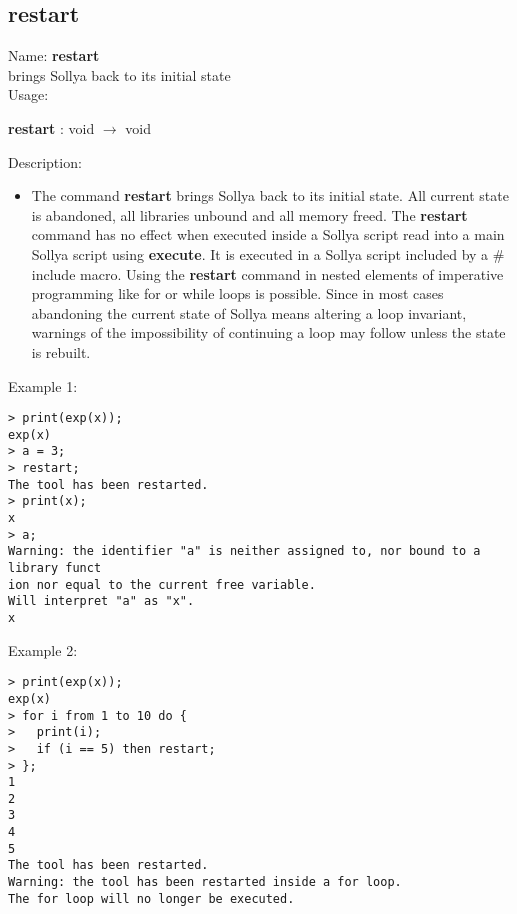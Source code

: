 \subsection{ restart }
\noindent Name: \textbf{restart}\\
brings Sollya back to its initial state\\

\noindent Usage: 
\begin{center}
\textbf{restart} : \textsf{void} $\rightarrow$ \textsf{void}\\
\end{center}
\noindent Description: \begin{itemize}

\item The command \textbf{restart} brings Sollya back to its initial state.  All
   current state is abandoned, all libraries unbound and all memory freed.
   The \textbf{restart} command has no effect when executed inside a Sollya
   script read into a main Sollya script using \textbf{execute}. It is executed
   in a Sollya script included by a $\#$include macro.
   Using the \textbf{restart} command in nested elements of imperative
   programming like for or while loops is possible. Since in most cases
   abandoning the current state of Sollya means altering a loop
   invariant, warnings of the impossibility of continuing a loop may
   follow unless the state is rebuilt.
\end{itemize}
\noindent Example 1: 
\begin{center}\begin{minipage}{15cm}\begin{Verbatim}[frame=single]
> print(exp(x));
exp(x)
> a = 3;
> restart;
The tool has been restarted.
> print(x);
x
> a;
Warning: the identifier "a" is neither assigned to, nor bound to a library funct
ion nor equal to the current free variable.
Will interpret "a" as "x".
x
\end{Verbatim}
\end{minipage}\end{center}
\noindent Example 2: 
\begin{center}\begin{minipage}{15cm}\begin{Verbatim}[frame=single]
> print(exp(x));
exp(x)
> for i from 1 to 10 do {
> 	print(i);
> 	if (i == 5) then restart;
> };
1
2
3
4
5
The tool has been restarted.
Warning: the tool has been restarted inside a for loop.
The for loop will no longer be executed.
\end{Verbatim}
\end{minipage}\end{center}
